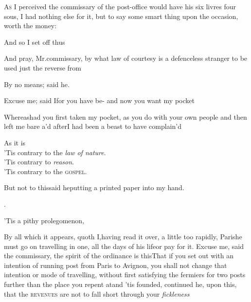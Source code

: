 \documentclass{article}
\begin{document}
\lettrine{A}{\!s} I perceived the commissary of the
post-office would have his six livres four sous, I had nothing else
for it, but to say some smart thing upon the occasion, worth the
money:

And so I set off thus\tsh{}

\tsh And pray, Mr.\@ commissary, by\break
what law of courtesy is a defenceless\break
stranger to be used just the reverse from\break
{}

By no means; said he.

Excuse me; said I\tsk for you have be-\break
{}\break
\tsk and now you want my pocket\tsh

Whereas\tsk had you first taken my pocket, as you do with your
own people\break
\tsk and then left me bare \hbox{a\tsk’d} after\tsk I had been a beast to have
complain’d\tsh

As it is\tsh\\
\tsh ’Tis contrary to the \textit{law of nature}.\\
\tsh ’Tis contrary to \textit{reason}.\\
\tsh ’Tis contrary to the \textsc{gospel}.

But not to this\tsh said he\tsk putting a printed
paper into my hand.\\
\centerline{.}
\etp{}
\newpage
\tsh\tsh ’Tis a pithy prolegomenon,
\break
\stick{\tsk \tsk \tsk \tsk \tsk \tsk \tsk \tsk \tsk \tsk \tsk \tsk}
\stick{\tsk \tsk \tsk \tsk \tsk \tsk \tsk \tsk \tsk \tsk \tsk \tsk}
\stick{\tsk \tsk \tsk \tsk \tsk \tsk \tsk \tsk \tsk \tsk \tsk \tsk}
\stick{\tsk \tsk \tsk \tsk \tsk \tsk \tsk \tsk \tsk \tsk \tsk \tsk}

\tsh By all which it appears, quoth I,\break having read it
over, a little too rapidly, 
Paris\tsk he must go on travelling in one, all the
days of his life\tsk or pay for it.\tsk\break
Excuse me, said the commissary, the spirit of the ordinance is
this\tsk That if you set out with an intention of running post
from Paris to Avignon, \etc you shall not change that intention
or mode of travelling, without first satisfying the fermiers for
two posts further than the place you repent at\tsk and ’tis
founded, continued he, upon this, that the \textsc{revenues} are
not to fall short through your \textit{fickleness}\tsh
\end{document}
